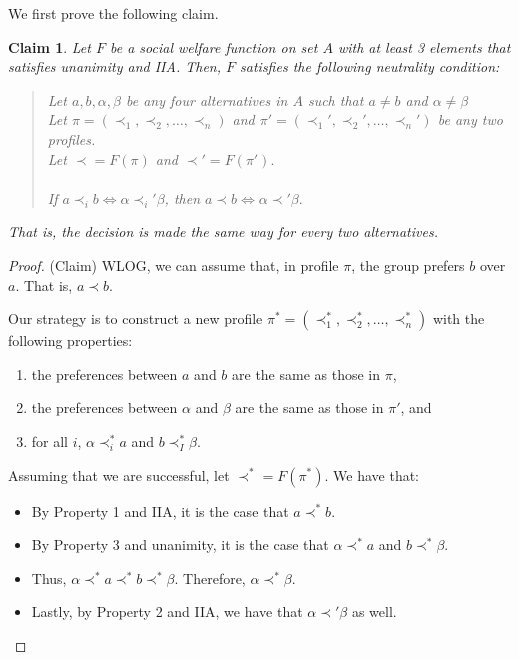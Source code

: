 \documentclass[10pt]{article}
\newtheorem{claim}[lemma]{Claim}
\begin{document}
\begin{itemize}
			We first prove the following claim.
			
			\begin{claim}
				Let $F$ be a social welfare function on set $A$ with at least 3 elements that satisfies unanimity and IIA. 
				Then, $F$ satisfies the following \emph{neutrality} condition:
				
				\begin{quote}
					Let $a, b, \alpha, \beta$ be any four alternatives in $A$ such that $a \neq b$ and $\alpha \neq \beta$ \\
					Let $\pi = (\prec_1, \prec_2, \dotsc, \prec_n)$ and $\pi' = (\prec_1', \prec_2', \dotsc, \prec_n')$ be any two profiles. \\
					Let $\prec = F(\pi)$ and $\prec' = F(\pi').$ \\
					\\
					If $a \prec_i b \iff \alpha \prec_i' \beta$, then $a \prec b \iff \alpha \prec' \beta.$
				\end{quote}
				
				That is, the decision is made the same way for every two alternatives.
			\end{claim}

			\begin{proof} (Claim) WLOG, we can assume that, in profile $\pi$, the group prefers $b$ over $a$. 
				That is, $a \prec b$.
				
				Our strategy is to construct a new profile $\pi^* = (\prec^*_1, \prec^*_2, \dotsc, \prec^*_n)$
				with the following properties:
				\begin{enumerate}
					\item the preferences between $a$ and $b$ are the same as those in $\pi$, 
					\item the preferences between $\alpha$ and $\beta$ are the same as those in $\pi'$, and
					\item for all $i$, $\alpha \prec^*_i a$ and $b \prec^*_I \beta$.
				\end{enumerate}
				
				Assuming that we are successful, let $\prec^* = F(\pi^*).$ We have that:

				\begin{itemize}
					\item By Property 1 and IIA, it is the case that $a \prec^* b$.
					\item By Property 3 and unanimity, it is the case that $\alpha \prec^* a$ and $b \prec^* \beta$.
					\item Thus, $\alpha \prec^* a \prec^* b \prec^* \beta$. Therefore, $\alpha \prec^* \beta$.
					\item Lastly, by Property 2 and IIA, we have that $\alpha \prec' \beta$ as well.
				\end{itemize}  
				

\end{proof}
\end{itemize}
\end{document}
